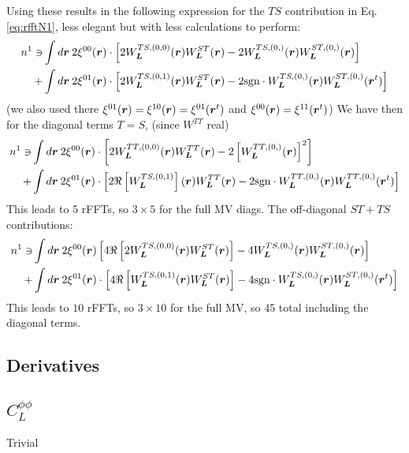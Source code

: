\documentclass[prd, superscriptaddress, tightenlines, longbibliography, nofootinbib, eqsecnum, amsfonts, amsmath, floatfix, onecolumn, notitlepage]{revtex4-2}
\begin{document}
Using these results in the following expression for the $TS$ contribution in Eq.\ref{eq:rfftN1}, less elegant but with less calculations to perform:
\begin{equation}
\begin{split}
n^{1} \ni	&\int d\boldsymbol{r} \: 2\xi^{00}(\boldsymbol{r}) \cdot \left[2W_{\boldsymbol{L}}^{TS, (0, 0)}(\boldsymbol{r}) W_{\boldsymbol{L}}^{ST}(\boldsymbol{r})- 2 W_{\boldsymbol{L}}^{TS, (0,)}(\boldsymbol{r})W_{\boldsymbol{L}}^{ST, (0,)}(\boldsymbol{r})\right] \\
	+&\int d\boldsymbol{r} \: 2\xi^{01}(\boldsymbol{r})\cdot\left[ 2 W_{\boldsymbol{L}}^{TS, (0,1)}(\boldsymbol{r}) W_{\boldsymbol{L}}^{ST}(\boldsymbol{r}) - 2\textrm{sgn}\cdot W_{\boldsymbol{L}}^{TS, (0,)}(\boldsymbol{r})W_{\boldsymbol{L}}^{ST, (0,)}(\boldsymbol{r}^t)\right]
\end{split}
\end{equation}
(we also used there $\xi^{01}(\boldsymbol{r}) = \xi^{10}(\boldsymbol{r}) = \xi^{01}(\boldsymbol{r}^t)$ and $\xi^{00}(\boldsymbol{r}) = \xi^{11}(\boldsymbol{r}^t)$)
We have then for the diagonal terms $T=S$, (since $W^{TT}$ real)
\begin{equation}
\begin{split}
	n^{1} \ni	&\int d\boldsymbol{r} \: 2\xi^{00}(\boldsymbol{r}) \cdot \left[2W_{\boldsymbol{L}}^{TT, (0, 0)}(\boldsymbol{r}) W_{\boldsymbol{L}}^{TT}(\boldsymbol{r})- 2 \left[W_{\boldsymbol{L}}^{TT, (0,)}(\boldsymbol{r})\right]^2\right] \\
	+&\int d\boldsymbol{r} \: 2\xi^{01}(\boldsymbol{r})\cdot\left[ 2 \Re\left[{W_{\boldsymbol{L}}^{TS, (0,1)}}\right](\boldsymbol{r}) W_{\boldsymbol{L}}^{TT}(\boldsymbol{r}) - 2\textrm{sgn}\cdot W_{\boldsymbol{L}}^{TT, (0,)}(\boldsymbol{r})W_{\boldsymbol{L}}^{TT, (0,)}(\boldsymbol{r}^t)\right]
	\end{split}
\end{equation}
This leads to $5$ rFFTs, so $3\times 5$ for the full MV diags. The off-diagonal $ST + TS $ contributions:
\begin{equation}
\begin{split}
n^{1} \ni	&\int d\boldsymbol{r} \:2 \xi^{00}(\boldsymbol{r})\left[ 4\Re \left[2W_{\boldsymbol{L}}^{TS, (0, 0)}(\boldsymbol{r}) W_{\boldsymbol{L}}^{ST}(\boldsymbol{r})\right]- 4 W_{\boldsymbol{L}}^{TS, (0,)}(\boldsymbol{r})W_{\boldsymbol{L}}^{ST, (0,)}(\boldsymbol{r})\right] \\
	+&\int d\boldsymbol{r} \: 2\xi^{01}(\boldsymbol{r})\cdot\left[ 4\Re\left[ W_{\boldsymbol{L}}^{TS, (0,1)}(\boldsymbol{r}) W_{\boldsymbol{L}}^{ST}(\boldsymbol{r})\right] - 4\textrm{sgn}\cdot W_{\boldsymbol{L}}^{TS, (0,)}(\boldsymbol{r})W_{\boldsymbol{L}}^{ST, (0,)}(\boldsymbol{r}^t)\right]
\end{split}
\end{equation}
This leads to $10 $ rFFTs, so $3\times 10$ for the full MV, so 45 total including the diagonal terms.

\subsection{Derivatives}
\subsection{$C_L^{\phi\phi}$}
Trivial
\end{document}
